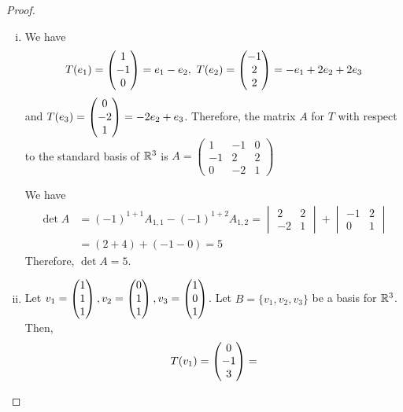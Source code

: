 \begin{proof}
    \renewcommand{\qedsymbol}{$\blacksquare$}
    \begin{enumerate}[(i)]
        \item We have 
        \[
            \begin{aligned}
                T(e_1)=\begin{pmatrix} 1\\ -1\\ 0\end{pmatrix}=e_1-e_2,\
                T(e_2)=\begin{pmatrix} -1\\ 2\\ 2\end{pmatrix}=-e_1+2e_2+2e_3
            \end{aligned}
        \] 
        and $T(e_3)=\begin{pmatrix} 0\\ -2\\ 1\end{pmatrix}=-2e_2+e_3$.
        Therefore, the matrix $A$ for $T$ with respect to the standard basis of $\mathbb R^3$ is $A=\begin{pmatrix}
            1 & -1 & 0\\
            -1 & 2 & 2\\
            0 & -2 & 1
        \end{pmatrix}$
        
        We have 
        \[
            \begin{aligned}
                \det A&=(-1)^{1+1}A_{1,1}-(-1)^{1+2}A_{1,2}
                =\begin{vmatrix}
                    2 & 2\\
                    -2 & 1
                \end{vmatrix}
                +\begin{vmatrix}
                    -1 & 2\\
                    0 & 1
                \end{vmatrix}\\
                &=(2+4)+(-1-0)=5
            \end{aligned}
        \]
        Therefore, $\det A=5$.
        \item Let $v_1=\begin{pmatrix} 1\\ 1\\ 1\end{pmatrix},v_2=\begin{pmatrix} 0\\ 1\\ 1\end{pmatrix},v_3=\begin{pmatrix} 1\\ 0\\ 1\end{pmatrix}$.
        Let $B=\{v_1,v_2,v_3\}$ be a basis for $\mathbb R^3$.
        Then, 
        \[
            \begin{aligned}
                T(v_1)=\begin{pmatrix} 0\\ -1\\ 3\end{pmatrix}=
            \end{aligned}
        \]
    \end{enumerate}
    
    \renewcommand{\qedsymbol}{}
\end{proof}
